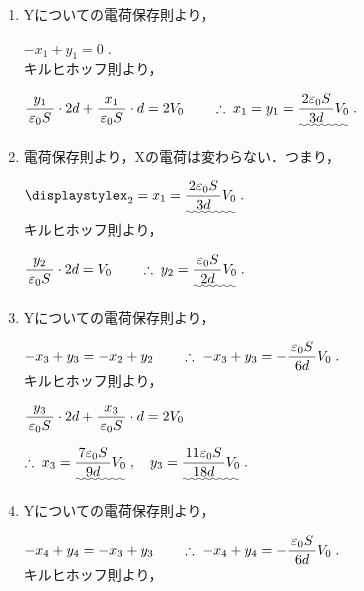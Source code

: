 \documentclass[../../../uem_phy_std_a.tex]{subfiles}
\begin{document}
    \begin{enumerate}
        \item Yについての電荷保存則より，
            
            \myspaceb%
            $\displaystyle%
                -x_1 + y_1 = 0 \;.
            $\\
            キルヒホッフ則より，
            
            \myspaceb%
            $\displaystyle%
                \myfracc{y_1}{\varepsilon_0 S} \cdot 2d%
                + \myfracc{x_1}{\varepsilon_0 S} \cdot d = 2V_0%
                \qquad \therefore \; x_1 = y_1%
                = \uwave{\myfracc{2\varepsilon_0 S}{3d} V_0} \;.
            $
        \item 電荷保存則より，Xの電荷は変わらない．つまり，
            
            \myspaceb%
            $\displaystyle%
                x_2 = x_1 = \uwave{\myfracc{2\varepsilon_0 S}{3d} V_0} \;.
            $\\
            キルヒホッフ則より，
            
            \myspaceb%
            $\displaystyle%
                \myfracc{y_2}{\varepsilon_0 S} \cdot 2d = V_0%
                \qquad \therefore \; y_2 = \uwave{\myfracc{\varepsilon_0 S}{2d} V_0} \;.
            $
        \item Yについての電荷保存則より，
            
            \myspaceb%
            $\displaystyle%
                -x_3 + y_3 = -x_2 + y_2%
                \qquad \therefore \; -x_3 + y_3 = -\myfracc{\varepsilon_0 S}{6d}V_0 \;.
            $\\
            キルヒホッフ則より，
            
            \myspaceb%
            $\displaystyle%
                \myfracc{y_3}{\varepsilon_0 S} \cdot 2d%
                + \myfracc{x_3}{\varepsilon_0 S} \cdot d = 2V_0
            $

            \myspaceb%
            $\displaystyle%
                \therefore \; x_3 = \uwave{\myfracc{7\varepsilon_0 S}{9d} V_0} \;,%
                \quad y_3 = \uwave{\myfracc{11\varepsilon_0 S}{18d} V_0} \;.
            $
        \item Yについての電荷保存則より，
            
            \myspaceb%
            $\displaystyle%
                -x_4 + y_4 = -x_3 + y_3%
                \qquad \therefore \; -x_4 + y_4 = -\myfracc{\varepsilon_0 S}{6d}V_0 \;.
            $\\
            キルヒホッフ則より，
            

\end{enumerate}
\end{document}
